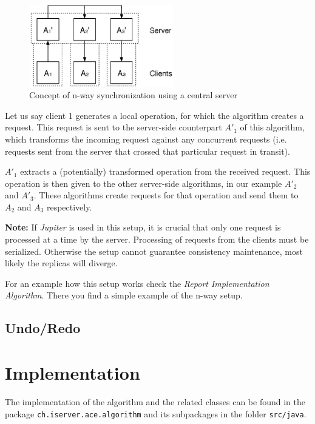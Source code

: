 \begin{figure}[htb]
 \centering
 \includegraphics[width=6.31cm,height=3.56cm]{../images/finalreport/algorithm_nway-details.eps}
 \caption{Concept of n-way synchronization using a central server}
 \label{fig:algorithm.nway-details}
\end{figure}

Let us say client 1 generates a local operation, for which the algorithm
creates a request. This request is sent to the server-side counterpart $A'_1$ of
this algorithm, which transforms the incoming request against any concurrent
requests (i.e. requests sent from the server that crossed that particular 
request in transit).

$A'_1$ extracts a (potentially) transformed operation from the received 
request. This operation is then given to the other server-side algorithms,
in our example $A'_2$ and $A'_3$. These algorithms create
requests for that operation and send them to $A_2$ and $A_3$ respectively.

\textbf{Note:} If \emph{Jupiter} is used in this setup, it is crucial that
only one request is processed at a time by the server. Processing of
requests from the clients must be serialized. Otherwise the setup cannot
guarantee consistency maintenance, most likely the replicas will diverge.

For an example how this setup works check the 
\emph{Report Implementation Algorithm}. There you find a simple example
of the n-way setup.


\subsection{Undo/Redo}
\label{sect:algorithm.undoredo}
% 
%



\section{Implementation}
The implementation of the algorithm and the related classes can be found
in the package \texttt{ch.\-iserver.\-ace.\-algorithm} and its subpackages
in the folder \texttt{src/java}.

